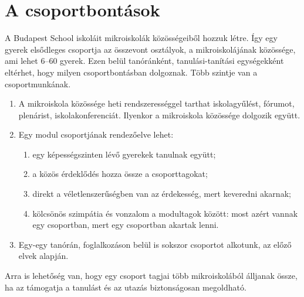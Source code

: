 \section{A csoportbontások}
\label{sec:csoportok}

A Budapest School iskoláit mikroiskolák közösségeiből hozzuk létre. Így egy gyerek elsődleges csoportja az összevont osztályok, a mikroiskolájának közössége, ami lehet 6--60  gyerek. Ezen belül tanóránként, tanulási-tanítási egységekként eltérhet, hogy milyen csoportbontásban dolgoznak. Több szintje van a csoportmunkának.
\begin{enumerate}
      \item A mikroiskola közössége heti rendszerességgel tarthat iskolagyűlést, fórumot, plenárist, iskolakonferenciát. Ilyenkor a mikroiskola közössége dolgozik együtt.
      \item  Egy modul csoportjának rendezőelve lehet:
            \begin{enumerate}
                  \item egy képességszinten lévő gyerekek tanulnak együtt;
                  \item a közös érdeklődés hozza össze a csoporttagokat;
                  \item  direkt a véletlenszerűségben van az érdekesség, mert keveredni akarnak;
                  \item kölcsönös szimpátia és vonzalom a modultagok között: most azért vannak egy csoportban, mert egy csoportban akartak lenni.
            \end{enumerate}
      \item  Egy-egy tanórán, foglalkozáson belül is sokszor csoportot alkotunk, az előző elvek alapján.

\end{enumerate}

Arra is lehetőség van, hogy egy csoport tagjai több mikroiskolából álljanak össze, ha az támogatja a tanulást és az utazás biztonságosan megoldható.